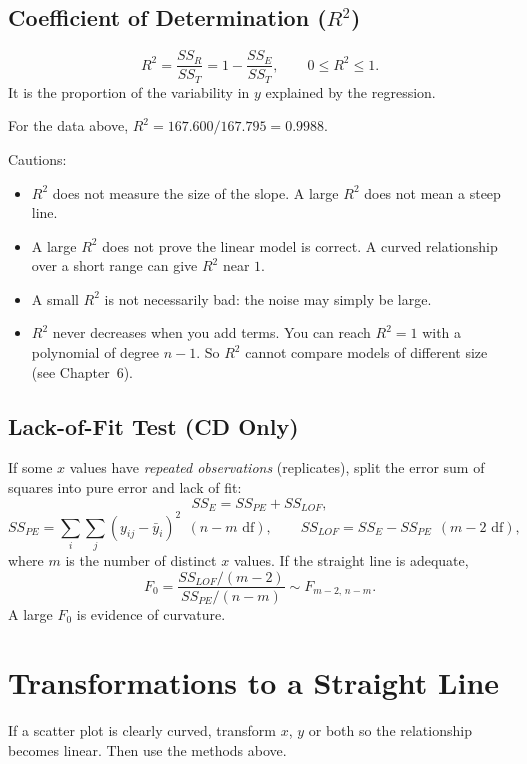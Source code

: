 \subsection{Coefficient of Determination ($R^2$)}\label{sec:regr2}

\begin{definition}[$R^2$]
\[ R^2=\frac{SS_R}{SS_T}=1-\frac{SS_E}{SS_T},\qquad 0\le R^2\le1. \]
It is the proportion of the variability in $y$ explained by the regression.
\end{definition}

For the data above, $R^2=167.600/167.795=0.9988$.

Cautions:
\begin{itemize}
  \item $R^2$ does not measure the size of the slope. A large $R^2$ does not mean a steep line.
  \item A large $R^2$ does not prove the linear model is correct. A curved relationship over a short range can give $R^2$ near $1$.
  \item A small $R^2$ is not necessarily bad: the noise may simply be large.
  \item $R^2$ never decreases when you add terms. You can reach $R^2=1$ with a polynomial of degree $n-1$. So $R^2$ cannot compare models of different size (see Chapter~6).
\end{itemize}

\subsection{Lack-of-Fit Test (CD Only)}

If some $x$ values have \emph{repeated observations} (replicates), split the error sum of squares into pure error and lack of fit:
\[ SS_E=SS_{PE}+SS_{LOF}, \]
\[ SS_{PE}=\sum_i\sum_j(y_{ij}-\bar{y}_i)^2\ \ (n-m\text{ df}),\qquad SS_{LOF}=SS_E-SS_{PE}\ \ (m-2\text{ df}), \]
where $m$ is the number of distinct $x$ values. If the straight line is adequate,
\[ F_0=\frac{SS_{LOF}/(m-2)}{SS_{PE}/(n-m)}\sim F_{m-2,\,n-m}. \]
A large $F_0$ is evidence of curvature.

\section{Transformations to a Straight Line}

If a scatter plot is clearly curved, transform $x$, $y$ or both so the relationship becomes linear. Then use the methods above.

